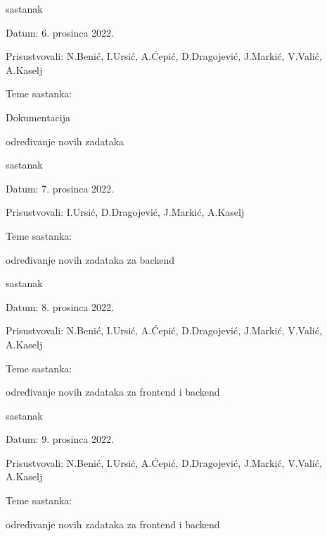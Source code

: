 \begin{packed_enum}
    \item  sastanak
			\item[] \begin{packed_item}
				\item Datum: 6. prosinca 2022.
				\item Prisustvovali: N.Benić, I.Ursić, A.Ćepić, D.Dragojević, J.Markić, V.Valić, A.Kaselj 
				\item Teme sastanka:
				\begin{packed_item}
					\item Dokumentacija
					\item  određivanje novih zadataka
				\end{packed_item}
			\end{packed_item}

   \item  sastanak
			\item[] \begin{packed_item}
				\item Datum: 7. prosinca 2022.
				\item Prisustvovali:  I.Ursić, D.Dragojević, J.Markić, A.Kaselj 
				\item Teme sastanka:
				\begin{packed_item}
					\item  određivanje novih zadataka za backend
				\end{packed_item}
			\end{packed_item}

   \item  sastanak
			\item[] \begin{packed_item}
				\item Datum: 8. prosinca 2022.
				\item Prisustvovali: N.Benić, I.Ursić, A.Ćepić, D.Dragojević, J.Markić, V.Valić, A.Kaselj 
				\item Teme sastanka:
				\begin{packed_item}
					\item  određivanje novih zadataka za frontend i backend
				\end{packed_item}
			\end{packed_item}

   \item  sastanak
			\item[] \begin{packed_item}
				\item Datum: 9. prosinca 2022.
				\item Prisustvovali: N.Benić, I.Ursić, A.Ćepić, D.Dragojević, J.Markić, V.Valić, A.Kaselj 
				\item Teme sastanka:
				\begin{packed_item}
					\item  određivanje novih zadataka za frontend i backend
				\end{packed_item}
			\end{packed_item}


\end{packed_enum}
